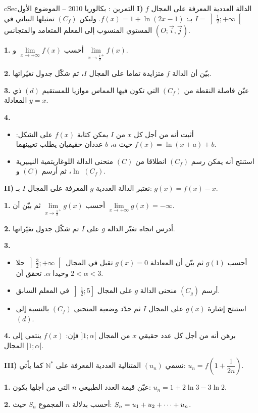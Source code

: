 \documentclass[12pt,a4paper]{article}
\newenvironment{BOX}[2]{\begin{otherlanguage}{english}\begin{arbox}{#1}{#2}}{\end{arbox}\end{otherlanguage}}
\newcounter{exo}
\newenvironment{tamrin}[1]{\stepcounter{exo}\begin{BOX}{cSec}{التمرين \theexo: #1}}{\end{BOX}}
\renewcommand{\cdots}{\mathinner{\cdotp\cdotp\cdotp}}
\newcommand{\N}{\mathbb{N}}
\newenvironment{sq}{\begin{itemize}[leftmargin=2.4em,itemsep=3pt]}{\end{itemize}}
\newcommand{\qa}{\item[(أ)]}\newcommand{\qb}{\item[(ب)]}\newcommand{\qc}{\item[(جـ)]}\newcommand{\qd}{\item[(د)]}\newcommand{\qe}{\item[(هـ)]}
\newcommand{\QQ}[1]{\par\smallskip\textbf{#1.} }
\begin{document}
\begin{tamrin}{بكالوريا 2010 -- الموضوع الأول}
\textbf{I)} $f$ الدالة العددية المعرفة على المجال $I=\left]\frac12;+\infty\right[$ بـ: $f(x)=1+\ln(2x-1)$.
وليكن $(C_f)$ تمثيلها البياني في المستوي المنسوب إلى المعلم المتعامد والمتجانس $(O;\vec i,\vec j)$.
\QQ{1} أحسب $\lim\limits_{x\to +\infty}f(x)$ و $\lim\limits_{x\to \frac12^{+}}f(x)$.
\QQ{2} بيّن أن الدالة $f$ متزايدة تماما على المجال $I$، ثم شكّل جدول تغيّراتها.
\QQ{3} عيّن فاصلة النقطة من $(C_f)$ التي تكون فيها المماس موازيا للمستقيم $(d)$ ذي المعادلة $y=x$.
\QQ{4}
\begin{sq}
\qa أثبت أنه من أجل كل $x$ من $I$ يمكن كتابة $f(x)$ على الشكل: $f(x)=\ln(x+a)+b$ حيث $a$، $b$ عددان حقيقيان يطلب تعيينهما.
\qb استنتج أنه يمكن رسم $(C_f)$ انطلاقا من $(C)$ منحنى الدالة اللوغاريتمية النيبيرية $\ln$، ثم أرسم $(C)$ و $(C_f)$.
\end{sq}

\textbf{II)} نعتبر الدالة العددية $g$ المعرفة على المجال $I$ بـ: $g(x)=f(x)-x$.
\QQ{1} أحسب $\lim\limits_{x\to \frac12^{+}}g(x)$ ثم بيّن أن $\lim\limits_{x\to +\infty}g(x)=-\infty$.
\QQ{2} أدرس اتجاه تغيّر الدالة $g$ على $I$ ثم شكّل جدول تغيّراتها.
\QQ{3}
\begin{sq}
\qa أحسب $g(1)$ ثم بيّن أن المعادلة $g(x)=0$ تقبل في المجال $\left]\frac32;+\infty\right[$ حلا وحيدا $\alpha$. تحقق أن $2<\alpha<3$.
\qb أرسم $(C_g)$ منحنى الدالة $g$ على المجال $\left]\frac12;5\right]$ في المعلم السابق.
\qc استنتج إشارة $g(x)$ على المجال $I$ ثم حدّد وضعية المنحنى $(C_f)$ بالنسبة إلى $(d)$.
\end{sq}
\QQ{4} برهن أنه من أجل كل عدد حقيقي $x$ من المجال $]1;\alpha[$ فإن: $f(x)$ ينتمي إلى المجال $]1;\alpha[$.

\textbf{III)} نسمي $(u_n)$ المتتالية العددية المعرفة على $\N^{*}$ كما يأتي: $u_n=f\left(1+\dfrac{1}{2n}\right)$.
\QQ{1} عيّن قيمة العدد الطبيعي $n$ التي من أجلها يكون: $u_n=1+2\ln 3-3\ln 2$.
\QQ{2} أحسب بدلالة $n$ المجموع $S_n$ حيث: $S_n=u_1+u_2+\cdots+u_n$.
\end{tamrin}
\end{document}
